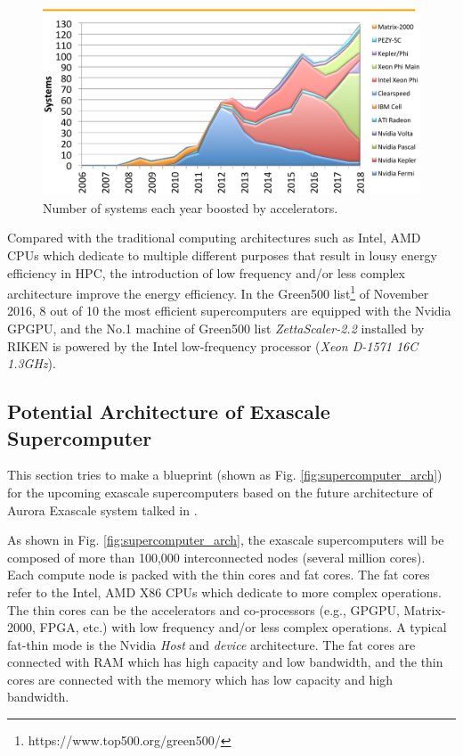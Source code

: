 \begin{figure}[t]
	\centering
	\includegraphics[width=0.99\linewidth]{fig/top500.pdf}
	\caption{Number of systems each year boosted by accelerators.}
	\label{top500-acc}
\end{figure}


Compared with the traditional computing architectures such as Intel, AMD CPUs which dedicate to multiple different purposes that result in lousy energy efficiency in HPC, the introduction of low frequency and/or less complex architecture improve the energy efficiency. In the Green500 list\footnote{https://www.top500.org/green500/} of November 2016, 8 out of 10 the most efficient supercomputers are equipped with the Nvidia GPGPU, and the No.1 machine of Green500 list \textit{ZettaScaler-2.2} installed by RIKEN is powered by the Intel low-frequency processor (\textit{Xeon D-1571 16C 1.3GHz}).

\subsection{Potential Architecture of Exascale Supercomputer} \label{Potential Architecture of Exascale Supercomputer}

This section tries to make a blueprint (shown as Fig. \ref{fig:supercomputer_arch}) for the upcoming exascale supercomputers based on the future architecture of Aurora Exascale system talked in \cite{TheNextPlatform}.

As shown in Fig. \ref{fig:supercomputer_arch}, the exascale supercomputers will be composed of more than 100,000 interconnected nodes (several million cores). Each compute node is packed with the thin cores and fat cores. The fat cores refer to the Intel, AMD X86 CPUs which dedicate to more complex operations. The thin cores can be the accelerators and co-processors (e.g., GPGPU, Matrix-2000, FPGA, etc.) with low frequency and/or less complex operations. A typical fat-thin mode is the Nvidia \textit{Host} and \textit{device} architecture. The fat cores are connected with RAM which has high capacity and low bandwidth, and the thin cores are connected with the memory which has low capacity and high bandwidth.

